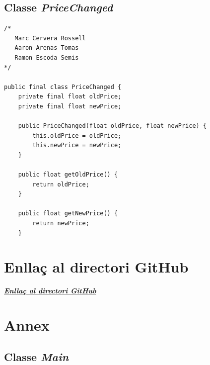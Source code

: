 \documentclass[a4paper,12pt]{article}
\begin{document}
\subsection{Classe \textit{PriceChanged}}
\begin{lstlisting}
/* 
   Marc Cervera Rossell
   Aaron Arenas Tomas
   Ramon Escoda Semis
*/

public final class PriceChanged {
    private final float oldPrice;
    private final float newPrice;

    public PriceChanged(float oldPrice, float newPrice) {
        this.oldPrice = oldPrice;
        this.newPrice = newPrice;
    }

    public float getOldPrice() {
        return oldPrice;
    }

    public float getNewPrice() {
        return newPrice;
    }
\end{lstlisting}

\section{Enllaç al directori GitHub}\label{sec:link}
\href{https://github.com/marc7666/3rd_practical_case_Software_engineering_II.git}{\textbf{\textit{Enllaç al directori GitHub}}}

\section{Annex}\label{sec:Annex}
\subsection{Classe \textit{Main}}
\end{document}

